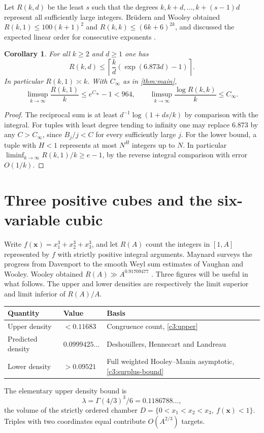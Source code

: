 \documentclass[11pt,letterpaper]{article}
\newtheorem{corollary}[corollary]{Corollary}
\theoremstyle{definition}
\begin{document}
Let $R(k,d)$ be the least $s$ such that the degrees
$k,k+d,\ldots,k+(s-1)d$ represent all sufficiently large integers.
Br\"udern and Wooley obtained $R(k,1)\le100(k+1)^2$ and
$R(k,k)\le(6k+6)^{2k}$, and discussed the expected linear order
for consecutive exponents \cite[Theorem 1.3 and Corollaries 1.4
and 1.5]{BWmix}.
\begin{corollary}\label{cor:mixed-prog}
For all $k\ge2$ and $d\ge1$ one has
\[
 R(k,d)\le\left\lceil\frac{k}{d}(\exp(6.873d)-1)\right\rceil .
\]
In particular $R(k,1)\asymp k$. With $C_\infty$ as in \cref{thm:main},
\[
 \limsup_{k\to\infty}\frac{R(k,1)}{k}\le e^{C_\infty}-1<964,
 \qquad
 \limsup_{k\to\infty}\frac{\log R(k,k)}{k}\le C_\infty .
\]
\end{corollary}
\begin{proof}
The reciprocal sum is at least
$d^{-1}\log(1+ds/k)$ by comparison with the integral. For tuples with
least degree tending to infinity one may replace $6.873$ by any
$C>C_\infty$, since $B_j/j<C$ for every sufficiently large $j$.
For the lower bound, a tuple with $H<1$ represents at most
$N^H$ integers up to $N$. In particular
$\liminf_{k\to\infty}R(k,1)/k\ge e-1$, by the reverse integral
comparison with error $O(1/k)$.
\end{proof}
\section{Three positive cubes and the six-variable cubic}\label{c3:density}
Write $f(\mathbf{x})=x_1^3+x_2^3+x_3^3$, and let $R(A)$ count the integers
in $[1,A]$ represented by $f$ with strictly positive integral arguments.
Maynard \cite{MaynardCubes} surveys the progress from Davenport to the smooth Weyl sum estimates of Vaughan and Wooley. Wooley obtained $R(A)\gg A^{0.91709477}$ \cite{c3:wooley}.
Three figures will be useful in what follows. The upper and lower
densities are respectively the limit superior and limit inferior of
$R(A)/A$.
\begin{center}
\small
\begin{tabular}{lll}
\toprule
Quantity & Value & Basis \\
\midrule
Upper density & $<0.11683$ & Congruence count, \eqref{c3:upper} \\
Predicted density & $0.0999425\ldots$ & Deshouillers, Hennecart and Landreau \cite{c3:dhl} \\
Lower density & $>0.09521$ & Full weighted Hooley--Manin asymptotic, \eqref{c3:surplus-bound} \\
\bottomrule
\end{tabular}
\end{center}
The elementary upper density bound is
\[
 \lambda=\Gamma(4/3)^3/6=0.1186788\ldots,
\]
the volume of the strictly ordered chamber
$D=\{0<x_1<x_2<x_3,\ f(\mathbf{x})<1\}$.
Triples with two coordinates equal contribute $O(A^{2/3})$ targets.
\end{document}
